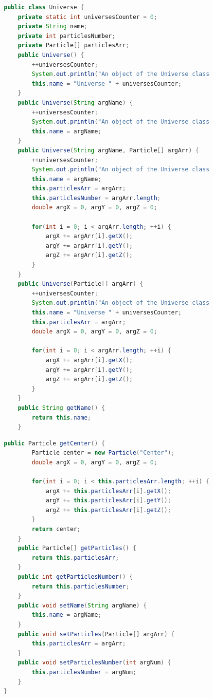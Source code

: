 \documentclass[a4paper, 14pt]{extarticle}
\begin{document}
\newpage

\begin{figure}[!htb]
\begin{lstlisting}[language=Java,caption={Класс Universe},label={lst:universe1}]
public class Universe {
    private static int universesCounter = 0;
    private String name;
    private int particlesNumber;
    private Particle[] particlesArr;
    public Universe() {
        ++universesCounter;
        System.out.println("An object of the Universe class has been created");
        this.name = "Universe " + universesCounter;
    }
    public Universe(String argName) {
        ++universesCounter;
        System.out.println("An object of the Universe class has been created");
        this.name = argName;
    }
    public Universe(String argName, Particle[] argArr) {
        ++universesCounter;
        System.out.println("An object of the Universe class has been created");
        this.name = argName;
        this.particlesArr = argArr;
        this.particlesNumber = argArr.length;
        double argX = 0, argY = 0, argZ = 0;

        for(int i = 0; i < argArr.length; ++i) {
            argX += argArr[i].getX();
            argY += argArr[i].getY();
            argZ += argArr[i].getZ();
        }
    }
    public Universe(Particle[] argArr) {
        ++universesCounter;
        System.out.println("An object of the Universe class has been created");
        this.name = "Universe " + universesCounter;
        this.particlesArr = argArr;
        double argX = 0, argY = 0, argZ = 0;

        for(int i = 0; i < argArr.length; ++i) {
            argX += argArr[i].getX();
            argY += argArr[i].getY();
            argZ += argArr[i].getZ();
        }
    }
    public String getName() {
        return this.name;
    }

\end{lstlisting}
\end{figure}

\newpage

\begin{figure}[!htb]
\begin{lstlisting}[language=Java,caption={Класс Universe (продолжение)},label={lst:universe2}]
    public Particle getCenter() {
        Particle center = new Particle("Center");
        double argX = 0, argY = 0, argZ = 0;

        for(int i = 0; i < this.particlesArr.length; ++i) {
            argX += this.particlesArr[i].getX();
            argY += this.particlesArr[i].getY();
            argZ += this.particlesArr[i].getZ();
        }
        return center;
    }
    public Particle[] getParticles() {
        return this.particlesArr;
    }
    public int getParticlesNumber() {
        return this.particlesNumber;
    }
    public void setName(String argName) {
        this.name = argName;
    }
    public void setParticles(Particle[] argArr) {
        this.particlesArr = argArr;
    }
    public void setParticlesNumber(int argNum) {
        this.particlesNumber = argNum;
    }
}
\end{lstlisting}
\end{figure}
\end{document}
